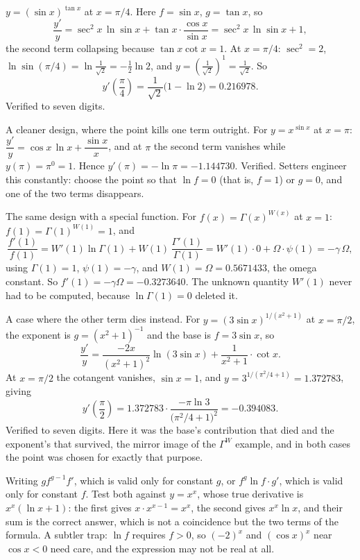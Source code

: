 \begin{worked}
$y=(\sin x)^{\tan x}$ at $x=\pi/4$. Here $f=\sin x$, $g=\tan x$, so
\[
\frac{y'}{y}=\sec^{2}x\,\ln\sin x+\tan x\cdot\frac{\cos x}{\sin x}=\sec^{2}x\,\ln\sin x+1,
\]
the second term collapsing because $\tan x\cot x=1$. At $x=\pi/4$: $\sec^{2}=2$, $\ln\sin(\pi/4)=\ln\tfrac{1}{\sqrt2}=-\tfrac12\ln2$, and $y=(\tfrac{1}{\sqrt2})^{1}=\tfrac{1}{\sqrt2}$. So
\[
y'\left(\frac\pi4\right)=\frac{1}{\sqrt2}\bigl(1-\ln 2\bigr)=0.216978 .
\]
Verified to seven digits.

A cleaner design, where the point kills one term outright. For $y=x^{\sin x}$ at $x=\pi$: $\dfrac{y'}{y}=\cos x\,\ln x+\dfrac{\sin x}{x}$, and at $\pi$ the second term vanishes while $y(\pi)=\pi^{0}=1$. Hence $y'(\pi)=-\ln\pi=-1.144730$. Verified. Setters engineer this constantly: choose the point so that $\ln f=0$ (that is, $f=1$) or $g=0$, and one of the two terms disappears.

The same design with a special function. For $f(x)=\Gamma(x)^{W(x)}$ at $x=1$: $f(1)=\Gamma(1)^{W(1)}=1$, and
\[
\frac{f'(1)}{f(1)}=W'(1)\ln\Gamma(1)+W(1)\,\frac{\Gamma'(1)}{\Gamma(1)}=W'(1)\cdot0+\Omega\cdot\psi(1)=-\gamma\,\Omega,
\]
using $\Gamma(1)=1$, $\psi(1)=-\gamma$, and $W(1)=\Omega=0.5671433$, the omega constant. So $f'(1)=-\gamma\Omega=-0.3273640$. The unknown quantity $W'(1)$ never had to be computed, because $\ln\Gamma(1)=0$ deleted it.

A case where the other term dies instead. For $y=(3\sin x)^{1/(x^{2}+1)}$ at $x=\pi/2$, the exponent is $g=(x^{2}+1)^{-1}$ and the base is $f=3\sin x$, so
\[
\frac{y'}{y}=\frac{-2x}{(x^{2}+1)^{2}}\ln(3\sin x)+\frac{1}{x^{2}+1}\cdot\cot x .
\]
At $x=\pi/2$ the cotangent vanishes, $\sin x=1$, and $y=3^{1/(\pi^{2}/4+1)}=1.372783$, giving
\[
y'\!\left(\frac\pi2\right)=1.372783\cdot\frac{-\pi\ln 3}{\bigl(\pi^{2}/4+1\bigr)^{2}}=-0.394083 .
\]
Verified to seven digits. Here it was the base's contribution that died and the exponent's that survived, the mirror image of the $\Gamma^{W}$ example, and in both cases the point was chosen for exactly that purpose.
\end{worked}

\begin{trap}
Writing $g f^{g-1}f'$, which is valid only for constant $g$, or $f^{g}\ln f\cdot g'$, which is valid only for constant $f$. Test both against $y=x^{x}$, whose true derivative is $x^{x}(\ln x+1)$: the first gives $x\cdot x^{x-1}=x^{x}$, the second gives $x^{x}\ln x$, and their sum is the correct answer, which is not a coincidence but the two terms of the formula. A subtler trap: $\ln f$ requires $f>0$, so $(-2)^{x}$ and $(\cos x)^{x}$ near $\cos x<0$ need care, and the expression may not be real at all.
\end{trap}

